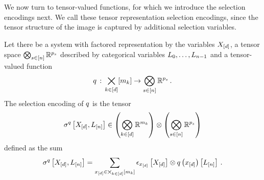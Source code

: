 \label{sec:selectionEncodingNotation}

We now turn to tensor-valued functions, for which we introduce the selection encodings next.
We call these tensor representation selection encodings, since the tensor structure of the image is captured by additional selection variables.

\begin{definition}\label{def:selectionEncoding}
	Let there be a system with factored representation by the variables $X_{[d]}$, a tensor space $\bigotimes_{s\in[n]}\mathbb{R}^{p_{s}}$ described by categorical variables $L_{0},\ldots,L_{n-1}$ and a tensor-valued function
	\begin{align*}
		q \,:\, \bigtimes_{k\in[d]}[m_{k}] \rightarrow \bigotimes_{s\in[n]}\mathbb{R}^{p_{s}} \, .
	\end{align*}
	The selection encoding of $q$ is the tensor
	\begin{align*}
		\sigma^{q}\left[X_{[d]},L_{[n]}\right]
		\in \left(\bigotimes_{k\in[d]} \mathbb{R}^{m_{k}}\right) \otimes \left(\bigotimes_{s\in[n]}\mathbb{R}^{p_{s}}\right)
	\end{align*}
	defined as the sum
	\begin{align*}
		 \sigma^{q}\left[X_{[d]},L_{[n]}\right]
		 = \sum_{x_{[d]}\in\bigtimes_{k\in[d]}[m_{k}]} \epsilon_{x_{[d]}}\left[X_{[d]}\right] \otimes q\left(x_{[d]}\right)\left[L_{[n]}\right] \, .
	\end{align*}
\end{definition}


